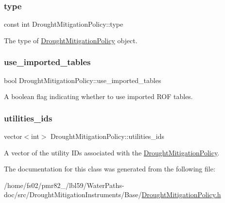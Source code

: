 \subsubsection{\texorpdfstring{type}{type}}
{\footnotesize\ttfamily const int Drought\+Mitigation\+Policy\+::type}



The type of \mbox{\hyperlink{classDroughtMitigationPolicy}{Drought\+Mitigation\+Policy}} object. 

\mbox{\label{classDroughtMitigationPolicy_ace2a2425f6608c34a3189c11445978a1}} 
\subsubsection{\texorpdfstring{use\+\_\+imported\+\_\+tables}{use\_imported\_tables}}
{\footnotesize\ttfamily bool Drought\+Mitigation\+Policy\+::use\+\_\+imported\+\_\+tables\hspace{0.3cm}{\ttfamily [protected]}}



A boolean flag indicating whether to use imported R\+OF tables. 

\mbox{\label{classDroughtMitigationPolicy_ad19fbc5a9fdf17ed50c0ba0b99d47eca}} 
\subsubsection{\texorpdfstring{utilities\+\_\+ids}{utilities\_ids}}
{\footnotesize\ttfamily vector$<$int$>$ Drought\+Mitigation\+Policy\+::utilities\+\_\+ids\hspace{0.3cm}{\ttfamily [protected]}}



A vector of the utility I\+Ds associated with the \mbox{\hyperlink{classDroughtMitigationPolicy}{Drought\+Mitigation\+Policy}}. 



The documentation for this class was generated from the following file\+:\begin{DoxyCompactItemize}
\item 
/home/fs02/pmr82\+\_/lbl59/\+Water\+Paths-\/doc/src/\+Drought\+Mitigation\+Instruments/\+Base/\mbox{\hyperlink{DroughtMitigationPolicy_8h}{Drought\+Mitigation\+Policy.\+h}}\end{DoxyCompactItemize}
